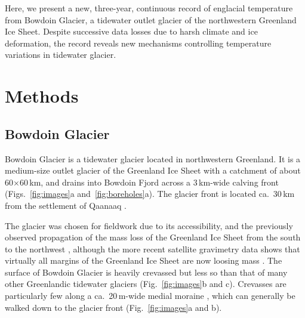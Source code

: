 \documentclass[utf8]{article}
\begin{document}
    Here, we present a new, three-year, continuous record of englacial
    temperature from Bowdoin Glacier, a tidewater outlet
    glacier of the northwestern Greenland Ice Sheet. Despite successive data
    losses due to harsh climate and ice deformation, the record reveals
    new mechanisms controlling temperature variations in tidewater glacier.


\section{Methods}

\subsection{Bowdoin Glacier}

    Bowdoin Glacier is a tidewater glacier located in northwestern Greenland.
    It is a medium-size outlet glacier of the Greenland Ice Sheet with a
    catchment of about 60$\times$60\,km, and drains into Bowdoin Fjord across a
    3\,km-wide calving front (Figs.~\ref{fig:images}a
    and~\ref{fig:boreholes}a). The glacier front is located ca.~30\,km from
    the settlement of Qaanaaq \citep[Fig.~1]{Sugiyama.etal.2015}.

    The glacier was chosen for fieldwork due to its accessibility, and the
    previously observed propagation of the mass loss of the Greenland Ice Sheet
    from the south to the northwest \citep{Khan.etal.2010}, although the more
    recent satellite gravimetry
    data shows that virtually all margins of the Greenland Ice Sheet are now
    loosing mass \citep{Groh.Horwath.2016}. The surface of Bowdoin Glacier
    is heavily crevassed but less so than that of many other Greenlandic
    tidewater glaciers (Fig.~\ref{fig:images}b and c). Crevasses are
    particularly few along a ca.~20\,m-wide medial moraine
    \citep[Fig.~68]{Chamberlin.1897}, which can generally be walked down to the
    glacier front (Fig.~\ref{fig:images}a and b).
\end{document}
